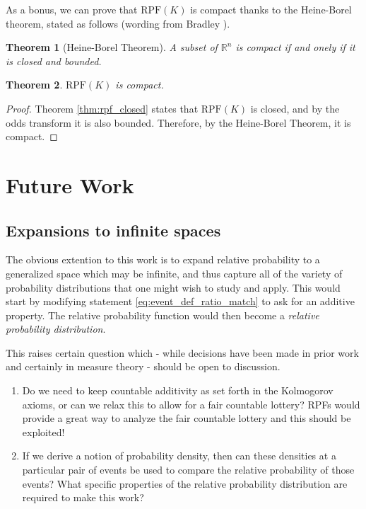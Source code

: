 \documentclass[twoside]{article}
\theoremstyle{plain}%
\newtheorem{theorem}{Theorem}[section]
\theoremstyle{definition}
\theoremstyle{remark}
\begin{document}
As a bonus, we can prove that \(\text{RPF}(K)\) is compact thanks to the Heine-Borel theorem, stated as follows (wording from Bradley \cite{bradley}).

\begin{theorem}[Heine-Borel Theorem]
A subset of \(\mathbb{R}^n\) is compact if and onely if it is closed and bounded.
\end{theorem}

\begin{theorem}
\(\text{RPF}(K)\) is compact.
\end{theorem}

\begin{proof}
Theorem \ref{thm:rpf_closed} states that \(\text{RPF}(K)\) is closed, and by the odds transform it is also bounded. Therefore, by the Heine-Borel Theorem, it is compact.
\end{proof}

\section{Future Work}
\subsection{Expansions to infinite spaces}
The obvious extention to this work is to expand relative probability to a generalized space which may be infinite, and thus capture all of the variety of probability distributions that one might wish to study and apply. This would start by modifying statement \ref{eq:event_def_ratio_match} to ask for an additive property. The relative probability function would then become a \textit{relative probability distribution}.

This raises certain question which - while decisions have been made in prior work and certainly in measure theory - should be open to discussion.
\begin{enumerate}
\item Do we need to keep countable additivity as set forth in the Kolmogorov axioms, or can we relax this to allow for a fair countable lottery? RPFs would provide a great way to analyze the fair countable lottery and this should be exploited!
\item If we derive a notion of probability density, then can these densities at a particular pair of events be used to compare the relative probability of those events? What specific properties of the relative probability distribution are required to make this work?
\end{enumerate}
\end{document}
